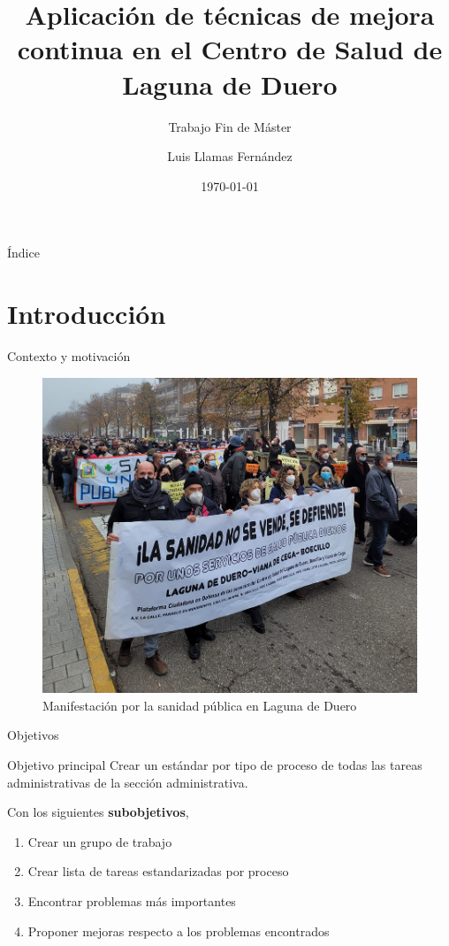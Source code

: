 \documentclass{beamer}
\title[Máster en Ingeniería Industrial]{Aplicación de técnicas de mejora continua en el Centro de Salud de Laguna de Duero}
\subtitle[]{Trabajo Fin de Máster}
\author{Luis Llamas Fernández}
\institute[]{Máster en Ingeniería Industrial}
\date{\today}
\begin{document}
\frame{\titlepage}

\begin{frame}{Índice}
    \tableofcontents[hideallsubsections]
\end{frame}


\section{Introducción}

\begin{frame}{Contexto y motivación}
    \begin{figure}
        \centering
        \includegraphics[height=0.7\textheight]{img/manifestacion.jpeg}
        \caption{Manifestación por la sanidad pública en Laguna de Duero}
    \end{figure}
\end{frame}

\begin{frame}{Objetivos}

    \begin{block}{Objetivo principal}
        Crear un \alert{estándar} por tipo de proceso de todas las tareas administrativas de la sección administrativa.
    \end{block}

    Con los siguientes \textbf{subobjetivos},

    \begin{enumerate}
        \item Crear un grupo de trabajo
        \item Crear lista de tareas estandarizadas por proceso
        \item Encontrar problemas más importantes
        \item Proponer mejoras respecto a los problemas encontrados
    \end{enumerate}
\end{frame}
\end{document}
